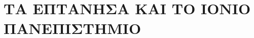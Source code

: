 \hypertarget{ux3c4ux3b1-ux3b5ux3c0ux3c4ux3b1ux3bdux3b7ux3c3ux3b1-ux3baux3b1ux3b9-ux3c4ux3bf-ux3b9ux3bfux3bdux3b9ux3bf-ux3c0ux3b1ux3bdux3b5ux3c0ux3b9ux3c3ux3c4ux3b7ux3bcux3b9ux3bf}{%
\chapter{ΤΑ ΕΠΤΑΝΗΣΑ ΚΑΙ ΤΟ ΙΟΝΙΟ
ΠΑΝΕΠΙΣΤΗΜΙΟ}\label{ux3c4ux3b1-ux3b5ux3c0ux3c4ux3b1ux3bdux3b7ux3c3ux3b1-ux3baux3b1ux3b9-ux3c4ux3bf-ux3b9ux3bfux3bdux3b9ux3bf-ux3c0ux3b1ux3bdux3b5ux3c0ux3b9ux3c3ux3c4ux3b7ux3bcux3b9ux3bf}}
